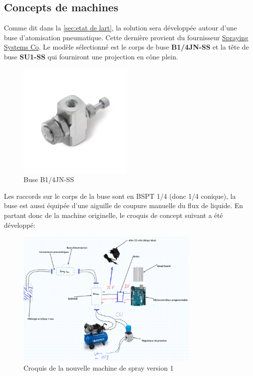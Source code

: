 \subsection{Concepts de machines}
Comme dit dans la \autoref{sec:etat de lart}, la solution sera développée autour d'une buse d'atomisation pneumatique.
Cette dernière provient du fournisseur \href{https://www.spray.com/fr-eu}{Spraying Systems Co}\footnotemark.
Le modèle sélectionné est le corps de buse \textbf{B1/4JN-SS} et la tête de buse \textbf{SU1-SS } qui fourniront une projection en cône plein.
\begin{figure}[H]
    \centering
    \includegraphics[width = 0.5\textwidth]{assets/figures/ameliorations/J_Series_1_8JN_and_1_4JN.jpeg}
    \caption[Buse B1/4JN-SS]{Buse B1/4JN-SS \cite{image_buse_spray_com}}
\end{figure}
Les raccords sur le corps de la buse sont en BSPT 1/4 (donc 1/4 conique), la buse est aussi équipée d'une aiguille de coupure manuelle du flux de liquide.
En partant donc de la machine originelle, le croquis de concept suivant a été développé:
\begin{figure}[H]
    \centering
    \includegraphics[width = 0.8\textwidth]{assets/figures/ameliorations/Croquis_machine_ecran_ver_1.png}
    \caption[Croquis nouvelle machine de spray ver. 1]{Croquis de la nouvelle machine de spray version 1}
\end{figure}

